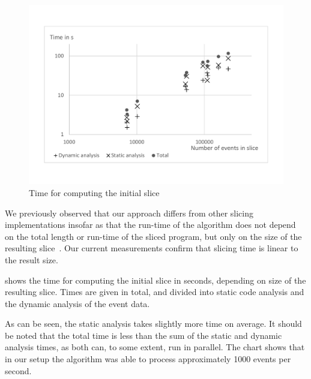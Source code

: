 \begin{figure}
	\centering
		\includegraphics[width=\linewidth, clip, trim={20mm 26mm 20mm 26mm}]{img/chart-initial.pdf}
	\caption{Time for computing the initial slice}
	\label{fig:chartinitial}
\end{figure}

We previously observed that our approach differs from other slicing implementations insofar as that the run-time of the algorithm does not depend on the total length or run-time of the sliced program, but only on the size of the resulting slice~\cite{treffer_dynamic_2014}.
Our current measurements confirm that slicing time is linear to the result size.

 shows the time for computing the initial slice in seconds, depending on size of the resulting slice.
Times are given in total, and divided into static code analysis and the dynamic analysis of the event data.

As can be seen, the static analysis takes slightly more time on average.
It should be noted that the total time is less than the sum of the static and dynamic analysis times, as both can, to some extent, run in parallel.
The chart shows that in our setup the algorithm was able to process approximately 1000 events per second.

